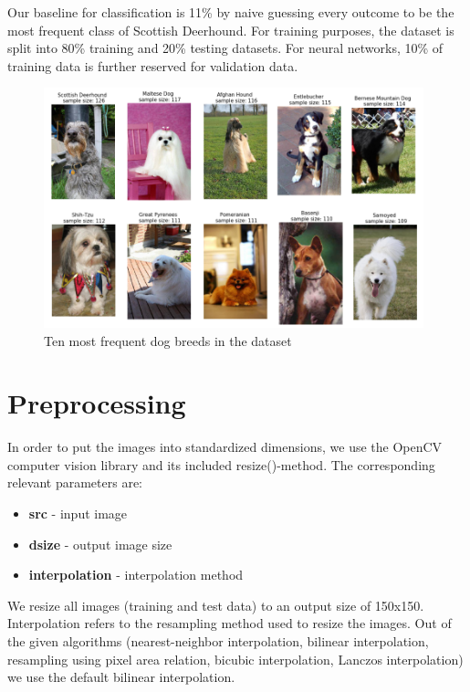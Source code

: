 \documentclass[11pt,titlepage,oneside,openany]{article}
\begin{document}
Our baseline for classification is 11\% by naive guessing every outcome to be the most frequent class of Scottish Deerhound. For training purposes, the dataset is split into 80\% training and 20\% testing datasets. For neural networks, 10\% of training data is further reserved for validation data.

\begin{figure}[H]
	\centering
	\includegraphics[width=11cm]{top10}
	\caption{Ten most frequent dog breeds in the dataset}
	\label{fig:top10}
\end{figure}

\section{Preprocessing}
\label{sec:prep}

In order to put the images into standardized dimensions, we use the OpenCV computer vision library and its included resize()-method. The corresponding relevant parameters are:

\begin{itemize}
	\item \textbf{src} - input image
	\item \textbf{dsize} - output image size
	\item \textbf{interpolation} - interpolation method
\end{itemize}

We resize all images (training and test data) to an output size of 150x150. Interpolation refers to the resampling method used to resize the images. Out of the given algorithms (nearest-neighbor interpolation, bilinear interpolation, resampling using pixel area relation, bicubic interpolation, Lanczos interpolation) we use the default bilinear interpolation.
\end{document}
